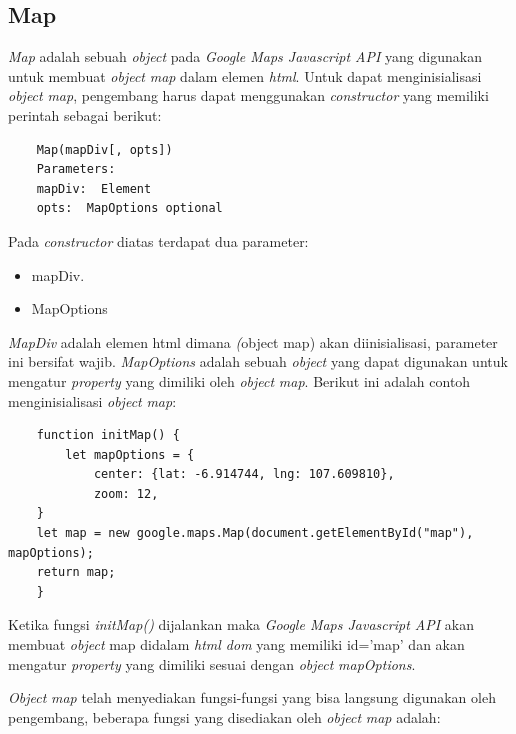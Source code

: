 \subsection{Map}
\textit{Map} adalah sebuah \textit{object} pada \textit{Google Maps Javascript API} yang digunakan untuk membuat \textit{object} \textit{map} dalam elemen \textit{html}. Untuk dapat menginisialisasi \textit{object} \textit{map}, pengembang harus dapat menggunakan \textit{constructor} yang memiliki perintah sebagai berikut:
\begin{lstlisting}
    Map(mapDiv[, opts])
    Parameters: 
    mapDiv:  Element
    opts:  MapOptions optional
\end{lstlisting}
Pada \textit{constructor} diatas terdapat dua parameter:
\begin{itemize}
    \item mapDiv.
    \item MapOptions
\end{itemize}
\textit{MapDiv} adalah elemen html dimana \textit(object map) akan diinisialisasi, parameter ini bersifat wajib. \textit{MapOptions} adalah sebuah \textit{object} yang dapat digunakan untuk mengatur \textit{property} yang dimiliki oleh \textit{object} \textit{map}. Berikut ini adalah contoh menginisialisasi \textit{object} \textit{map}:
\begin{lstlisting}
    function initMap() {
        let mapOptions = {
            center: {lat: -6.914744, lng: 107.609810},
            zoom: 12,
    }
    let map = new google.maps.Map(document.getElementById("map"), mapOptions);
    return map;
    }
\end{lstlisting}
Ketika fungsi \textit{initMap()} dijalankan maka \textit{Google Maps Javascript API} akan membuat \textit{object} map didalam \textit{html dom} yang memiliki id='map' dan akan mengatur \textit{property} yang dimiliki sesuai dengan \textit{object} \textit{mapOptions}.

\textit{Object} \textit{map} telah menyediakan fungsi-fungsi yang bisa langsung digunakan oleh pengembang, beberapa fungsi yang disediakan oleh  \textit{object} \textit{map} adalah:

